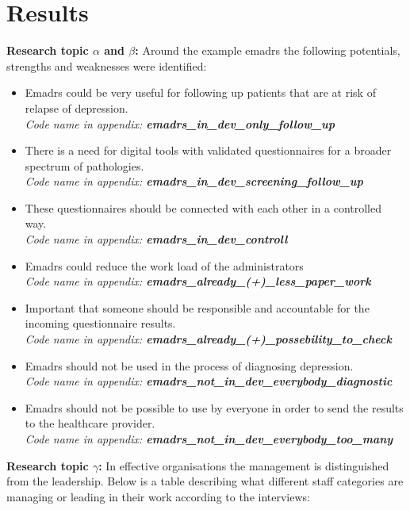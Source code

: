 \documentclass[12pt,a4paper,oneside]{article}
\let\oldcite\cite
\renewcommand*\cite[1]{\textsuperscript{\oldcite{#1}}}
\begin{document}
\section*{Results}
{\bf Research topic $\alpha$ and $\beta$:} Around the example e{\sc madrs} the following potentials, strengths and weaknesses were identified:
\begin{itemize}
\item E{\sc madrs} could be very useful for following up patients that are at risk of relapse of depression.\\{\it Code name in appendix: {\bfseries emadrs\_in\_dev\_only\_follow\_up}}
\item There is a need for digital tools with validated questionnaires for a broader spectrum of pathologies.\\{\it Code name in appendix: {\bfseries emadrs\_in\_dev\_screening\_follow\_up}}
\item These questionnaires should be connected with each other in a controlled way.\\{\it Code name in appendix: {\bfseries emadrs\_in\_dev\_controll}}
\item E{\sc madrs} could reduce the work load of the administrators\\{\it Code name in appendix: {\bfseries emadrs\_already\_(+)\_less\_paper\_work}}
\item Important that someone should be responsible and accountable for the incoming questionnaire results.\\{\it Code name in appendix: {\bfseries emadrs\_already\_(+)\_possebility\_to\_check}}
\item E{\sc madrs} should not be used in the process of diagnosing depression.\\{\it Code name in appendix: {\bfseries emadrs\_not\_in\_dev\_everybody\_diagnostic}}
\item E{\sc madrs} should not be possible to use by everyone in order to send the results to the healthcare provider.\\{\it Code name in appendix: {\bfseries emadrs\_not\_in\_dev\_everybody\_too\_many}}
\end{itemize}
{\bf Research topic $\gamma$:} In effective organisations the management is distinguished from the leadership\cite{leader1}. Below is a table describing what different staff categories are managing or leading in their work according to the interviews:
\end{document}
